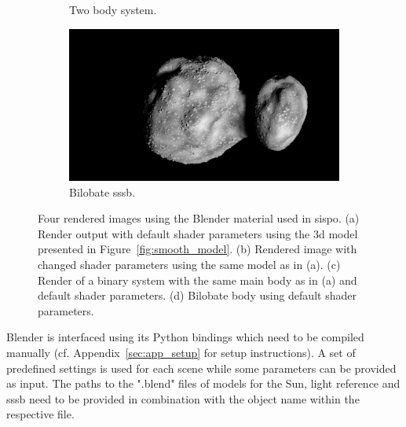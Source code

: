 \begin{figure}[htb]
\begin{subfigure}[b]{0.47\textwidth}
        \caption{Two body system.}
        \label{fig:render_out_main_moon}
    \end{subfigure}
    \begin{subfigure}[b]{0.47\textwidth}
        \centering
        \includegraphics[width=\textwidth]{doc/thesis/0_figures/procedural_terrain/bilobe2.png}
        \caption{Bilobate \gls{sssb}.}
        \label{fig:render_out_bilobe}
    \end{subfigure}
    \caption{Four rendered images using the Blender material used in \gls{sispo}. (a) Render output with default shader parameters using the \gls{3d} model presented in Figure~\ref{fig:smooth_model}. (b) Rendered image with changed shader parameters using the same model as in (a). (c) Render of a binary system with the same main body as in (a) and default shader parameters. (d) Bilobate body using default shader parameters.}
    \label{fig:render_out}
\end{figure}

Blender is interfaced using its Python bindings which need to be compiled manually (cf. Appendix~\ref{sec:app_setup} for setup instructions). A set of predefined settings is used for each scene while some parameters can be provided as input. The paths to the ".blend" files of models for the Sun, light reference and \gls{sssb} need to be provided in combination with the object name within the respective file.

